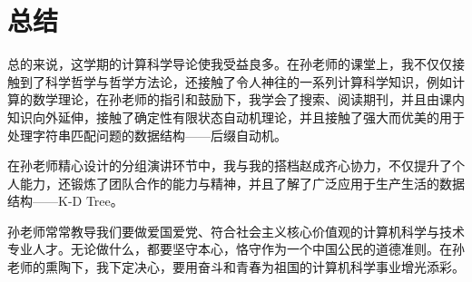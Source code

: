 \documentclass{article}
\begin{document}
\section{总结}
总的来说，这学期的计算科学导论使我受益良多。在孙老师的课堂上，我不仅仅接触到了科学哲学与哲学方法论，还接触了令人神往的一系列计算科学知识，例如计算的数学理论，在孙老师的指引和鼓励下，我学会了搜索、阅读期刊，并且由课内知识向外延伸，接触了确定性有限状态自动机理论，并且接触了强大而优美的用于处理字符串匹配问题的数据结构——后缀自动机。\par
在孙老师精心设计的分组演讲环节中，我与我的搭档赵成齐心协力，不仅提升了个人能力，还锻炼了团队合作的能力与精神，并且了解了广泛应用于生产生活的数据结构——K-D Tree。\par
孙老师常常教导我们要做爱国爱党、符合社会主义核心价值观的计算机科学与技术专业人才。无论做什么，都要坚守本心，恪守作为一个中国公民的道德准则。在孙老师的熏陶下，我下定决心，要用奋斗和青春为祖国的计算机科学事业增光添彩。

\newpage
\end{document}
